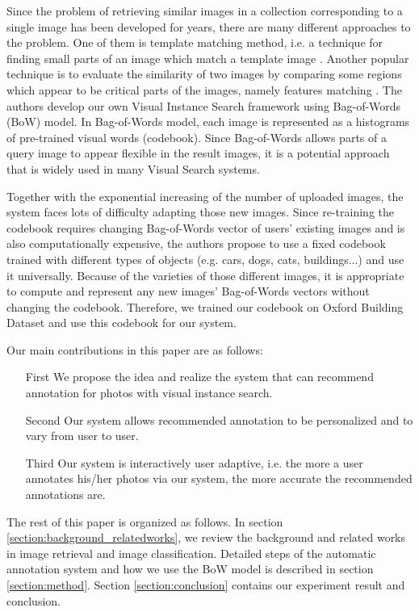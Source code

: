 Since the problem of retrieving similar images in a collection corresponding to a single image has been developed for years, there are many different approaches to the problem. One of them is template matching method, i.e. a technique for finding small parts of an image which match a template image \cite{brunelli_template_matching,Rosenfeld4309663,Gharavi913587}. Another popular technique is to evaluate the similarity of two images by comparing some regions which appear to be critical parts of the images, namely features matching \cite{Belongie710790,Rubner,Viola990517}. The authors develop our own Visual Instance Search framework using Bag-of-Words (BoW) model. In Bag-of-Words model, each image is represented as a histograms of pre-trained visual words (codebook). Since Bag-of-Words allows parts of a query image to appear flexible in the result images, it is a potential approach that is widely used in many Visual Search systems. 

Together with the exponential increasing of the number of uploaded images, the system faces lots of difficulty adapting those new images. Since re-training the codebook requires changing Bag-of-Words vector of users' existing images and is also computationally expensive, the authors propose to use a fixed codebook trained with different types of objects (e.g. cars, dogs, cats, buildings...) and use it universally. Because of the varieties of those different images, it is appropriate to compute and represent any new images' Bag-of-Words vectors without changing the codebook. Therefore, we trained our codebook on Oxford Building Dataset and use this codebook for our system.

Our main contributions in this paper are as follows:
\begin{enumerate}
	\item[First] We propose the idea and realize the system that can recommend annotation for photos with visual instance search.
	\item[Second] Our system allows recommended annotation to be personalized and to vary from user to user.
	\item[Third] Our system is interactively user adaptive, i.e. the more a user annotates his/her photos via our system, the more accurate the recommended annotations are.
\end{enumerate}

The rest of this paper is organized as follows. In section \ref{section:background_relatedworks}, we review the background and related works in image retrieval and image classification. Detailed steps of the automatic annotation system and how we use the BoW model is described in section \ref{section:method}. Section \ref{section:conclusion} contains our experiment result and conclusion.
